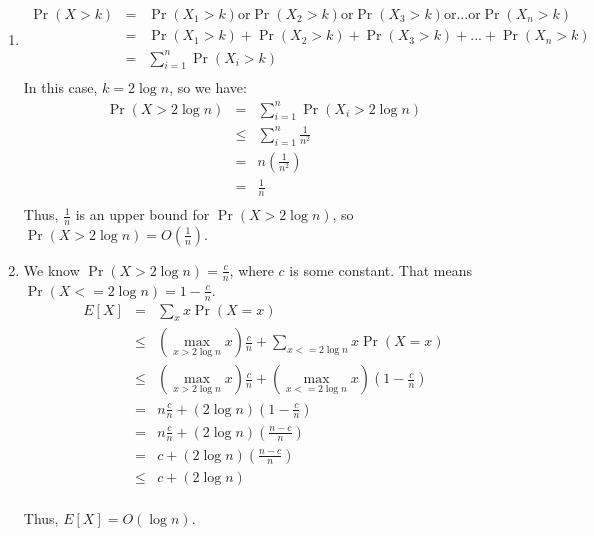 \documentclass[12pt]{article}
\begin{document}
\begin{enumerate}[label=(\alph*)]
  \item
  \begin{eqnarray*}
  \Pr(X > k) &=& \Pr(X_1 > k) \text{or} \Pr(X_2 > k) \text{or} \Pr(X_3 > k) \text{or} ... \text{or} \Pr(X_n > k)\\
  &=& \Pr(X_1 > k) + \Pr(X_2 > k) + \Pr(X_3 > k) + ... + \Pr(X_n > k)\\
  &=& \sum_{i=1}^n \Pr(X_i > k)\\
  \end{eqnarray*}
  In this case, $k = 2\log n$, so we have:
  \begin{eqnarray*}
  \Pr(X > 2\log n) &=& \sum_{i=1}^n \Pr(X_i > 2\log n)\\
  &\le& \sum_{i=1}^n \frac{1}{n^2}\\
  &=& n \left(\frac{1}{n^2}\right)\\
  &=& \frac{1}{n}\\
  \end{eqnarray*}
  Thus, $\frac{1}{n}$ is an upper bound for $\Pr(X > 2\log n)$, so $\Pr(X > 2\log n) = O\left(\frac{1}{n}\right)$.
  \item We know $\Pr(X > 2\log n) = \frac{c}{n}$, where $c$ is some constant. That means $\Pr(X <= 2\log n) = 1 - \frac{c}{n}$.
  \begin{eqnarray*} 
  E[X] &=& \sum_x x\Pr(X = x)\\
  &\le& \left(\max_{x > 2\log n} x\right) \frac{c}{n} + \sum_{x <= 2\log n} x\Pr(X = x)\\
  &\le& \left(\max_{x > 2\log n} x\right) \frac{c}{n} + \left(\max_{x <= 2\log n} x\right) \left(1 -\frac{c}{n}\right) \\
  &=& n \frac{c}{n} + (2 \log n)\left(1 -\frac{c}{n}\right)\\
  &=& n \frac{c}{n} + (2 \log n)\left(\frac{n-c}{n}\right)\\
  &=& c + (2 \log n)\left(\frac{n-c}{n}\right)\\
  &\le& c + (2 \log n)\\
  \end{eqnarray*}

  Thus, $E[X] = O(\log n)$.

\end{enumerate}
\end{document}
